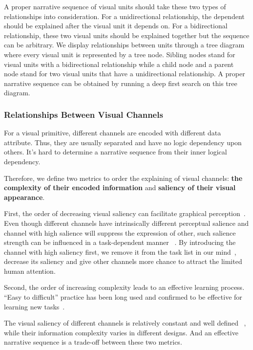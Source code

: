A proper narrative sequence of visual units should take these two types of relationships into consideration. For a unidirectional relationship, the dependent should be explained after the visual unit it depends on. For a bidirectional relationship, these two visual units should be explained together but the sequence can be arbitrary. 
We display relationships between units through a tree diagram where every visual unit is represented by a tree node. Sibling nodes stand for visual units with a bidirectional relationship while a child node and a parent node stand for two visual units that have a unidirectional relationship. A proper narrative sequence can be obtained by running a deep first search on this tree diagram. 



\subsubsection{Relationships Between Visual Channels}
For a visual primitive, different channels are encoded with different data attribute. Thus, they are usually separated and have no logic dependency upon others. It's hard to determine a narrative sequence from their inner logical dependency. 

Therefore, we define two metrics to order the explaining of visual channels: \textbf{the complexity of their encoded information} and \textbf{saliency of their visual appearance}.

First, the order of decreasing visual saliency can facilitate graphical perception~\cite{cleveland_graphical_1984}. Even though different channels have intrinsically different perceptual salience and channel with high salience will suppress the expression of other, such salience strength can be influenced in a task-dependent manner ~\cite{nothdurft_salience_2000}. By introducing the channel with high saliency first, we remove it from the task list in our mind~\cite{itti2001computational}, decrease its saliency and give other channels more chance to attract the limited human attention. 

Second, the order of increasing complexity leads to an effective learning process. “Easy to difficult” practice has been long used and confirmed to be effective for learning new tasks~\cite{bliss_effects_1992}.
 
The visual saliency of different channels is relatively constant and  well defined ~\cite{munzner_visualization_2014,cleveland_graphical_1984}, while their information complexity varies in different designs. And an effective narrative sequence is a trade-off between these two metrics. 

